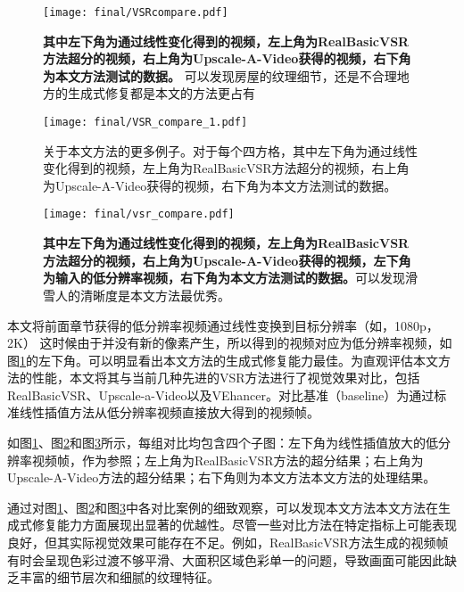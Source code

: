 \begin{figure}[h]
    \centering
    \texttt{[image: final/VSRcompare.pdf]}
    \caption{\textbf{其中左下角为通过线性变化得到的视频，左上角为RealBasicVSR方法超分的视频，右上角为Upscale-A-Video获得的视频，右下角为本文方法测试的数据。} 可以发现房屋的纹理细节，还是不合理地方的生成式修复都是本文的方法更占有}
    \label{fig:vsr2}
\end{figure}

\begin{figure}[h]
    \centering
    \texttt{[image: final/VSR\_compare\_1.pdf]}
    \caption{关于本文方法的更多例子。对于每个四方格，其中左下角为通过线性变化得到的视频，左上角为RealBasicVSR方法超分的视频，右上角为Upscale-A-Video获得的视频，右下角为本文方法测试的数据。 }
    \label{fig:vsr3}
\end{figure}

\begin{figure}[h]
    \centering
    \texttt{[image: final/vsr\_compare.pdf]}
    \caption{\textbf{其中左下角为通过线性变化得到的视频，左上角为RealBasicVSR方法超分的视频，右上角为Upscale-A-Video获得的视频，左下角为输入的低分辨率视频，右下角为本文方法测试的数据。}可以发现滑雪人的清晰度是本文方法最优秀。}
    \label{fig:vsr1}
\end{figure}


本文将前面章节获得的低分辨率视频通过线性变换到目标分辨率（如，1080p， 2K） 这时候由于并没有新的像素产生，所以得到的视频对应为低分辨率视频，如图\ref{fig:vsr2}的左下角。可以明显看出本文方法的生成式修复能力最佳。为直观评估本文方法的性能，本文将其与当前几种先进的VSR方法进行了视觉效果对比，包括RealBasicVSR\cite{RealBasicVSR}、Upscale-a-Video\cite{zhou2024upscaleavideo}以及VEhancer\cite{he2024venhancer}。对比基准（baseline）为通过标准线性插值方法从低分辨率视频直接放大得到的视频帧。

如图\ref{fig:vsr2}、图\ref{fig:vsr3}和图\ref{fig:vsr1}所示，每组对比均包含四个子图：左下角为线性插值放大的低分辨率视频帧，作为参照；左上角为RealBasicVSR方法的超分结果；右上角为Upscale-A-Video方法的超分结果；右下角则为本文方法本文方法的处理结果。


通过对图\ref{fig:vsr2}、图\ref{fig:vsr3}和图\ref{fig:vsr1}中各对比案例的细致观察，可以发现本文方法本文方法在生成式修复能力方面展现出显著的优越性。尽管一些对比方法在特定指标上可能表现良好，但其实际视觉效果可能存在不足。例如，RealBasicVSR\cite{RealBasicVSR}方法生成的视频帧有时会呈现色彩过渡不够平滑、大面积区域色彩单一的问题，导致画面可能因此缺乏丰富的细节层次和细腻的纹理特征。

